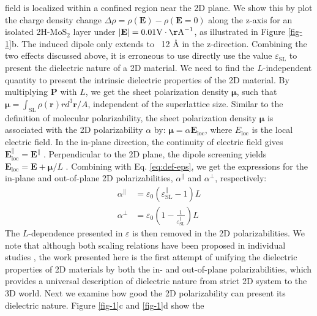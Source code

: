 \documentclass[journal=ancac3,manuscript=article,email=true,hyperref=true,keywords=false]{achemso}
\begin{document}
field is localized within a confined region near the 2D plane. We show
this by plot the charge density change
$\Delta \rho=\rho(\mathbf{E}) - \rho(\mathbf{E}=0)$ along the z-axis
for an isolated 2H-MoS$_{2}$ layer under
$|\mathbf{E}|=0.01 \mathrm{V\cdot \AA}^{-1}$, as illustrated in Figure
\ref{fig-1}b. The induced dipole only extends to ~12 \AA{} in the
z-direction. Combining the two effects discussed above, it is
erroneous to use directly use the value $\varepsilon_{\mathrm{SL}}$
to present the dielectric nature of a 2D material. We need to find the
$L$-independent quantity to present the intrinsic dielectric
properties of the 2D material. By multiplying $\mathbf{P}$ with $L$,
we get the sheet polarization density $\mathbf{\mu}$, such that
$\mathbf{\mu}=\int_{\mathrm{SL}} \rho(\mathbf{r})rd^{3} \mathbf{r}/A$,
independent of the superlattice size. Similar to the definition of
molecular polarizability, the sheet polarization density
$\mathbf{\mu}$ is associated with the 2D polarizability $\alpha$ by:
$\mathbf{\mu} = \alpha \mathbf{E}_{\mathrm{loc}}$, where
$E_{\mathrm{loc}}$ is the local electric field. In the in-plane
direction, the continuity of electric field gives
$\mathbf{E}^{\parallel}_{\mathrm{loc}}=\mathbf{E}^{\parallel}$
\cite{Markel_2016}. Perpendicular to the 2D plane, the dipole
screening yields $\mathbf{E}_{\mathrm{loc}}=\mathbf{E}+\mathbf{\mu}/L$
\cite{Meyer_2001_dipole_slab,T_bik_2004}. Combining with
Eq. \ref{eq:def-eps}, we get the expressions for the in-plane and
out-of-plane 2D polarizabilities, $\alpha^{\parallel}$ and
$\alpha^{\perp}$, respectively:
\begin{eqnarray}
  \label{eq:alpha-para-def}
  \alpha^{\parallel} &= \varepsilon_{0}(\varepsilon_{\mathrm{SL}}^{\parallel} - 1)L\\
  \label{eq:alpha-perp-def}
    \alpha^{\perp} &= \varepsilon_{0}\left(1 - \frac{1}{\varepsilon_{\mathrm{SL}}^{\parallel}}\right)L
\end{eqnarray}
The $L$-dependence presented in $\varepsilon$ is then removed in the
2D polarizabilities.  We note that although both scaling relations
have been proposed in individual studies
\cite{Cudazzo_2011_screening_2D,Kumar_2016_jpcc,Kumar_2016_PRB}, the
work presented here is the first attempt of unifying the dielectric
properties of 2D materials by both the in- and out-of-plane
polarizabilities, which provides a universal description of dielectric
nature from strict 2D system to the  3D world. Next we examine
how good the 2D polarizability can present its dielectric
nature. Figure \ref{fig-1}c and \ref{fig-1}d show the
\end{document}
